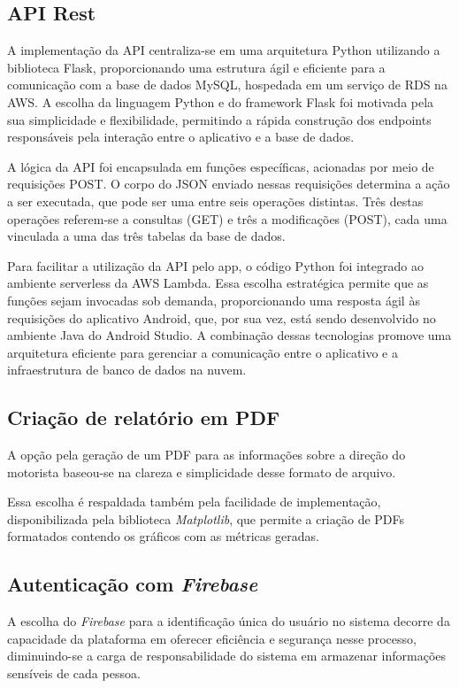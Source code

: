     \subsection{API Rest}
    A implementação da API centraliza-se em uma arquitetura Python utilizando a biblioteca Flask, proporcionando uma estrutura ágil e eficiente para a comunicação com a base de dados MySQL, hospedada em um serviço de RDS na AWS. A escolha da linguagem Python e do framework Flask foi motivada pela sua simplicidade e flexibilidade, permitindo a rápida construção dos endpoints responsáveis pela interação entre o aplicativo e a base de dados.

    A lógica da API foi encapsulada em funções específicas, acionadas por meio de requisições POST. O corpo do JSON enviado nessas requisições determina a ação a ser executada, que pode ser uma entre seis operações distintas. Três destas operações referem-se a consultas (GET) e três a modificações (POST), cada uma vinculada a uma das três tabelas da base de dados.

    Para facilitar a utilização da API pelo app, o código Python foi integrado ao ambiente serverless da AWS Lambda. Essa escolha estratégica permite que as funções sejam invocadas sob demanda, proporcionando uma resposta ágil às requisições do aplicativo Android, que, por sua vez, está sendo desenvolvido no ambiente Java do Android Studio. A combinação dessas tecnologias promove uma arquitetura eficiente para gerenciar a comunicação entre o aplicativo e a infraestrutura de banco de dados na nuvem.


    \subsection{Criação de relatório em PDF}

    A opção pela geração de um PDF para as informações sobre a direção do motorista baseou-se na clareza e simplicidade desse formato de arquivo. 
    
    Essa escolha é respaldada também pela facilidade de implementação, disponibilizada pela biblioteca \textit{Matplotlib}, que permite a criação de PDFs formatados contendo os gráficos com as métricas geradas.

    \subsection{Autenticação com \textit{Firebase}}

    A  escolha do \textit{Firebase} para a identificação única do usuário no sistema decorre da capacidade da plataforma em oferecer eficiência e segurança nesse processo, diminuindo-se a carga de responsabilidade do sistema em armazenar informações sensíveis de cada pessoa. 
    
